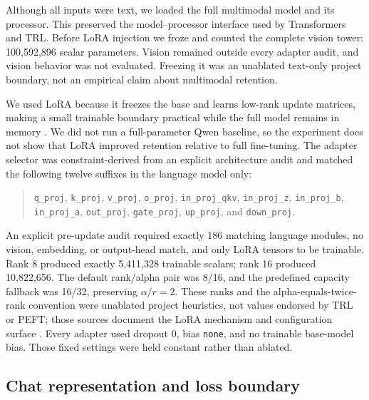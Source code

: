 Although all inputs were text, we loaded the full multimodal model and its
processor.  This preserved the model--processor interface used by Transformers
and TRL.  Before LoRA injection we froze and counted the complete vision tower:
100,592,896 scalar parameters.  Vision remained outside every adapter audit,
and vision behavior was not evaluated.  Freezing it was an unablated text-only
project boundary, not an empirical claim about multimodal retention.
%

We used LoRA because it freezes the base and learns low-rank update matrices,
making a small trainable boundary practical while the full model remains in
memory \citep{hu2021lora}.  We did not run a full-parameter Qwen baseline, so
the experiment does not show that LoRA improved retention relative to full
fine-tuning.  The adapter selector was constraint-derived from an explicit
architecture audit and matched the following twelve suffixes in the language
model only:
\begin{quote}
\small
\texttt{q\_proj}, \texttt{k\_proj}, \texttt{v\_proj},
\texttt{o\_proj}, \texttt{in\_proj\_qkv},
\texttt{in\_proj\_z}, \texttt{in\_proj\_b},
\texttt{in\_proj\_a}, \texttt{out\_proj},
\texttt{gate\_proj}, \texttt{up\_proj}, and
\texttt{down\_proj}. 
\end{quote}
An explicit pre-update audit required exactly 186 matching language modules,
no vision, embedding, or output-head match, and only LoRA tensors to be
trainable.  Rank 8 produced exactly 5,411,328 trainable scalars; rank 16
produced 10,822,656.  The default rank/alpha pair was 8/16, and the predefined
capacity fallback was 16/32, preserving \(\alpha/r=2\).  These ranks and the
alpha-equals-twice-rank convention were unablated project heuristics, not values
endorsed by TRL or PEFT; those sources document the LoRA mechanism and
configuration surface \citep{trlpeft,peftlora}. Every adapter used dropout 0,
bias \texttt{none}, and no trainable base-model bias. Those fixed settings were
held constant rather than ablated. %

\subsection{Chat representation and loss boundary}
\label{sec:chat-loss}

